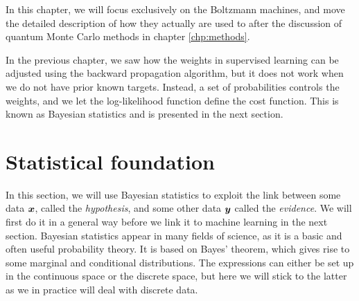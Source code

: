In this chapter, we will focus exclusively on the Boltzmann machines, and move the detailed description of how they actually are used to after the discussion of quantum Monte Carlo methods in chapter \ref{chp:methods}.

In the previous chapter, we saw how the weights in supervised learning can be adjusted using the backward propagation algorithm, but it does not work when we do not have prior known targets. Instead, a set of probabilities controls the weights, and we let the log-likelihood function define the cost function. This is known as Bayesian statistics and is presented in the next section.

\section{Statistical foundation} \label{sec:bayes}
In this section, we will use Bayesian statistics to exploit the link between some data $\boldsymbol{{x}}$, called the \textit{hypothesis}, and some other data $\boldsymbol{{y}}$ called the \textit{evidence}.  We will first do it in a general way before we link it to machine learning in the next section. Bayesian statistics appear in many fields of science, as it is a basic and often useful probability theory. It is based on Bayes' theorem, which gives rise to some marginal and conditional distributions. The expressions can either be set up in the continuous space or the discrete space, but here we will stick to the latter as we in practice will deal with discrete data. 

